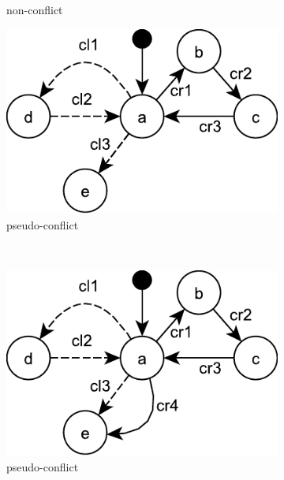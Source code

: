 \begin{figure}[ht]
\begin{subfigure}[t]{0.48\linewidth}
	\caption{non-conflict}
	\label{fig:statechart_03}
\end{subfigure}
\hfill
\begin{subfigure}[t]{0.48\linewidth}
	\includegraphics[width=\linewidth]{statechart_04}
	\caption{pseudo-conflict}
	\label{fig:statechart_04}
\end{subfigure}
\\
\begin{subfigure}[t]{0.48\linewidth}
	\includegraphics[width=\linewidth]{statechart_05}
	\caption{pseudo-conflict}
	\label{fig:statechart_05}
\end{subfigure}
\hfill
\begin{subfigure}[t]{0.48\linewidth}

\end{subfigure}
\end{figure}
